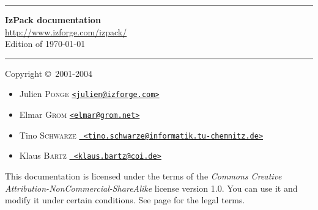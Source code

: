 \begin{titlepage}

\begin{center}
\hrule
\vspace{2em}
\Huge
\textbf{IzPack documentation}\\[2em]
\normalsize
\href{http://www.izforge.com/izpack/}{\url{http://www.izforge.com/izpack/}}\\[2em]
Edition of \today \\[2em]
\hrule
\end{center}

\vfill
\noindent Copyright \copyright\ 2001-2004
\begin{itemize}
\item Julien \textsc{Ponge} \href{mailto:julien@izforge.com}{\texttt{<julien@izforge.com>}}
\item Elmar \textsc{Grom} \href{mailto:elmar@grom.net}{\texttt{<elmar@grom.net>}} 
\item Tino \textsc{Schwarze} \href{mailto:tino.schwarze@informatik.tu-chemnitz.de}{\texttt{
                             <tino.schwarze@informatik.tu-chemnitz.de>}}
\item Klaus \textsc{Bartz} \href{mailto:klaus.bartz@coi.de}{\texttt{
                             <klaus.bartz@coi.de>}}
\end{itemize}

\vfill
\noindent
This documentation is licensed under the terms of the \textit{Commons Creative 
Attribution-NonCommercial-ShareAlike} license version 1.0. You can use it and
modify it under certain conditions. See page \pageref{CC-license} for the
legal terms.

\end{titlepage}
